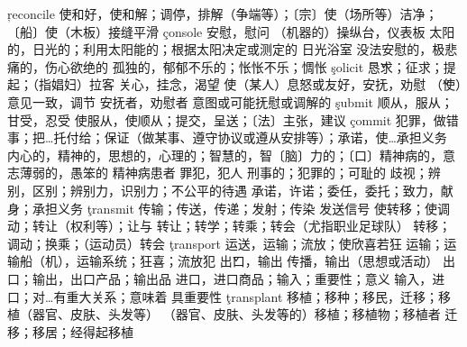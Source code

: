 \begin{multicols}{2}
\c{reconcile}  \vt 使和好，使和解；调停，排解（争端等）；〔宗〕使（场所等）洁净；〔船〕使（木板）接缝平滑
\c{console}  \vt 安慰，慰问 \n （机器的）操纵台，仪表板
  \a 太阳的，日光的；利用太阳能的；根据太阳决定或测定的 \n 日光浴室 
  \a 没法安慰的，极悲痛的，伤心欲绝的
  \a 孤独的，郁郁不乐的；怅怅不乐；惆怅
\c{solicit}  \v 恳求；征求；提起；（指娼妇）拉客
  \n 关心，挂念，渴望
  \vt 使（某人）息怒或友好，安抚，劝慰 \v （使）意见一致，调节 \n 安抚者，劝慰者 \a 意图或可能抚慰或调解的
\c{submit}  \vi 顺从，服从；甘受，忍受 \vt 使服从，使顺从；提交，呈送；〔法〕主张，建议
\c{commit}  \vt 犯罪，做错事；把…托付给；保证（做某事、遵守协议或遵从安排等）；承诺，使…承担义务 
  \a 内心的，精神的，思想的，心理的；智慧的，智〔脑〕力的；〔口〕精神病的，意志薄弱的，愚笨的 \n 精神病患者 
  \n 罪犯，犯人 \a 刑事的；犯罪的；可耻的
  \n 歧视；辨别，区别；辨别力，识别力；不公平的待遇 
  \n 承诺，许诺；委任，委托；致力，献身；承担义务
\c{transmit}  \vt 传输；传送，传递；发射；传染 \vi 发送信号
  \vt 使转移；使调动；转让（权利等）；让与 \vi 转让；转学；转乘；转会（尤指职业足球队） \n 转移；调动；换乘；（运动员）转会 
\c{transport}  \vt 运送，运输；流放；使欣喜若狂 \n 运输；运输船（机），运输系统；狂喜；流放犯
  \v 出口，输出 \vt 传播，输出（思想或活动） \n 出口；输出，出口产品；输出品
  \n 进口，进口商品；输入；重要性；意义 \vt 输入，进口；对…有重大关系；意味着 \vi 具重要性
\c{transplant}  \vt 移植；移种；移民，迁移；移植（器官、皮肤、头发等） \n （器官、皮肤、头发等的）移植；移植物；移植者 \vi 迁移；移居；经得起移植 

\end{multicols}
